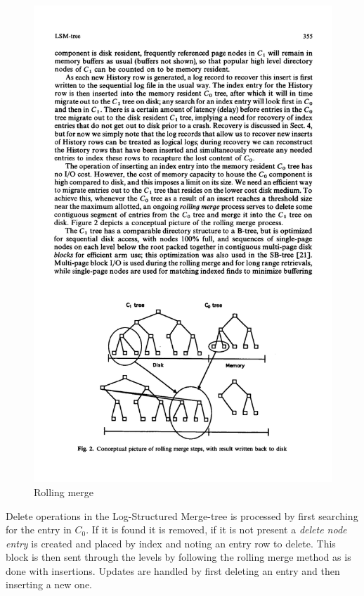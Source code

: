 \begin{figure}[ht]
    \centering
    \includegraphics[scale=0.7]{figures/merge_LSM.pdf}
    \caption{Rolling merge\cite{LSMTree}}
    \label{fig:LSMMerge}
\end{figure}

Delete operations in the Log-Structured Merge-tree is processed by first searching for the entry in $C_0$. If it is found it is removed, if it is not present a \emph{delete node entry} is created and placed by index and noting an entry row to delete. This block is then sent through the levels by following the rolling merge method as is done with insertions. Updates are handled by first deleting an entry and then inserting a new one.
\newline

